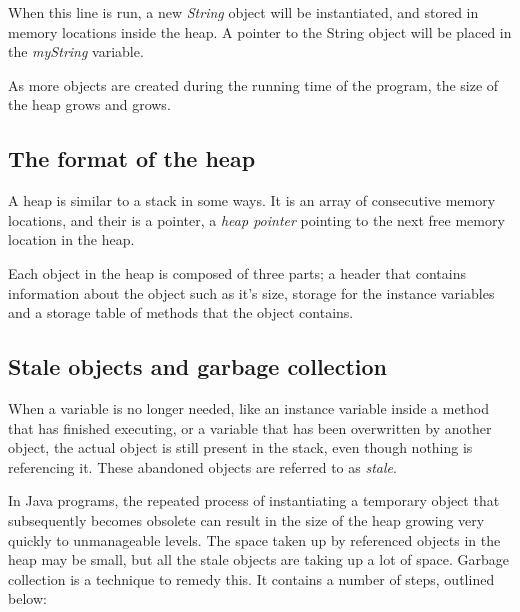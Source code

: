 When this line is run, a new {\it String} object will be instantiated, and
stored in memory locations inside the heap. A pointer to the String object
will be placed in the {\it myString} variable.

As more objects are created during the running time of the program, the size
of the heap grows and grows.

\subsection{The format of the heap}

A heap is similar to a stack in some ways. It is an array of consecutive
memory locations, and their is a pointer, a {\it heap pointer} pointing to the
next free memory location in the heap.

Each object in the heap is composed of three parts; a header that contains
information about the object such as it's size, storage for the instance
variables and a storage table of methods that the object contains.

\subsection{Stale objects and garbage collection}

When a variable is no longer needed, like an instance variable inside a method
that has finished executing, or a variable that has been overwritten by
another object, the actual object is still present in the stack, even though
nothing is referencing it. These abandoned objects are referred to as {\it
stale}.

In Java programs, the repeated process of instantiating a temporary object
that subsequently becomes obsolete can result in the size of the heap growing
very quickly to unmanageable levels. The space taken up by referenced objects
in the heap may be small, but all the stale objects are taking up a lot of
space. Garbage collection is a technique to remedy this. It contains a number
of steps, outlined below:

